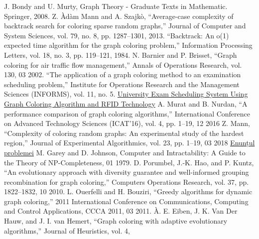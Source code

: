 \documentclass[runningheads]{llncs}
\begin{document}
%
%
%
% 
% 
%
\begin{thebibliography}{8}

    J. Bondy and U. Murty, Graph Theory - Graduate Texts in Mathematic.
    Springer, 2008.
    Z. \`{A}d\`{a}m Mann and A. Szajk\`{o}, “Average-case complexity of backtrack
    search for coloring sparse random graphs,” Journal of Computer and
    System Sciences, vol. 79, no. 8, pp. 1287–1301, 2013.
    “Backtrack: An o(1) expected time algorithm for the graph coloring
    problem,” Information Processing Letters, vol. 18, no. 3, pp. 119–121,
    1984.
    N. Barnier and P. Brisset, “Graph coloring for air traffic flow management,” 
    Annals of Operations Research, vol. 130, 03 2002.
    “The application of a graph coloring method to an examination scheduling problem,” 
    Institute for Operations Research and the Management
    Sciences (INFORMS), vol. 11, no. 5.
    \href{http://www.ijimt.org/papers/359-D0129.pdf}{University Exam Scheduling System Using Graph
    Coloring Algorithm and RFID Technology}
    A. Murat and B. Nurdan, “A performance comparison of graph coloring algorithms,” 
    International Conference on Advanced Technology
    Sciences (ICAT’16), vol. 4, pp. 1–19, 12 2016
    Z. Mann, “Complexity of coloring random graphs: An experimental
    study of the hardest region,” Journal of Experimental Algorithmics,
    vol. 23, pp. 1–19, 03 2018
    \href{https://acs-aa-challenge.github.io/acs-aa-challenge/18-np-2-colouring/}{Enunțul problemei}
    M. Garey and D. Johnson, Computer and Intractability: A Guide to the
    Theory of NP-Completeness, 01 1979.
    D. Porumbel, J.-K. Hao, and P. Kuntz, “An evolutionary approach with
    diversity guarantee and well-informed grouping recombination for graph
    coloring,” Computers Operations Research, vol. 37, pp. 1822–1832, 10
    2010.
    L. Ouerfelli and H. Bouziri, “Greedy algorithms for dynamic graph coloring,” 2011 International Conference on Communications, Computing
    and Control Applications, CCCA 2011, 03 2011.
    \`{A}. E. Eiben, J. K. Van Der Hauw, and J. I. van Hemert, “Graph coloring
    with adaptive evolutionary algorithms,” Journal of Heuristics, vol. 4,

\end{thebibliography}
\end{document}
